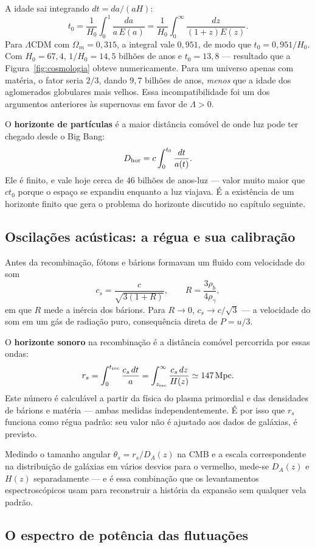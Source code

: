 \documentclass[11pt,a4paper]{article}
\begin{document}
A idade sai integrando $dt=da/(aH)$:
\[
t_0=\frac{1}{H_0}\int_0^{1}\frac{da}{a\,E(a)}
=\frac{1}{H_0}\int_0^{\infty}\frac{dz}{(1+z)E(z)}.
\]
Para $\Lambda$CDM com $\Omega_m=0{,}315$, a integral vale $0{,}951$, de modo que $t_0=0{,}951/H_0$. Com $H_0=67{,}4$, $1/H_0=14{,}5$ bilhões de anos e $t_0=13{,}8$ --- resultado que a Figura~\ref{fig:cosmologia} obteve numericamente. Para um universo apenas com matéria, o fator seria $2/3$, dando $9{,}7$ bilhões de anos, \emph{menos} que a idade dos aglomerados globulares mais velhos. Essa incompatibilidade foi um dos argumentos anteriores às supernovas em favor de $\Lambda>0$.

O \textbf{horizonte de partículas} é a maior distância comóvel de onde luz pode ter chegado desde o Big Bang:
\[
D_{\rm hor}=c\int_0^{t_0}\frac{dt}{a(t)}.
\]
Ele é finito, e vale hoje cerca de $46$ bilhões de anos-luz --- valor muito maior que $ct_0$ porque o espaço se expandiu enquanto a luz viajava. É a existência de um horizonte finito que gera o problema do horizonte discutido no capítulo seguinte.

\subsection*{Oscilações acústicas: a régua e sua calibração}

Antes da recombinação, fótons e bárions formavam um fluido com velocidade do som
\[
c_s=\frac{c}{\sqrt{3(1+R)}},
\qquad
R=\frac{3\rho_b}{4\rho_\gamma},
\]
em que $R$ mede a inércia dos bárions. Para $R\to0$, $c_s\to c/\sqrt{3}$ --- a velocidade do som em um gás de radiação puro, consequência direta de $P=u/3$.

O \textbf{horizonte sonoro} na recombinação é a distância comóvel percorrida por essas ondas:
\[
r_s=\int_0^{t_{\rm rec}}\frac{c_s\,dt}{a}=\int_{z_{\rm rec}}^{\infty}\frac{c_s\,dz}{H(z)}\simeq147\,\mathrm{Mpc}.
\]
Este número é calculável a partir da física do plasma primordial e das densidades de bárions e matéria --- ambas medidas independentemente. É por isso que $r_s$ funciona como régua padrão: seu valor não é ajustado aos dados de galáxias, é previsto.

Medindo o tamanho angular $\theta_s=r_s/D_A(z)$ na CMB e a escala correspondente na distribuição de galáxias em vários desvios para o vermelho, mede-se $D_A(z)$ e $H(z)$ separadamente --- e é essa combinação que os levantamentos espectroscópicos usam para reconstruir a história da expansão sem qualquer vela padrão.

\subsection*{O espectro de potência das flutuações}
\end{document}
